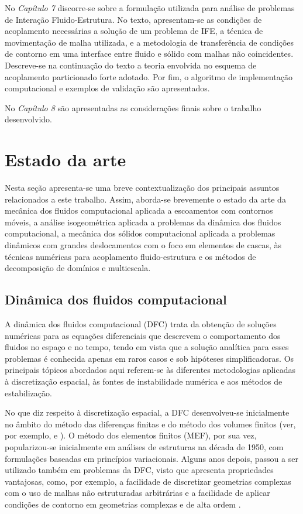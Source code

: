 No \textit{Capítulo 7} discorre-se sobre a formulação utilizada para análise de problemas de Interação Fluido-Estrutura. No texto, apresentam-se as condições de acoplamento necessárias a solução de um problema de IFE, a técnica de movimentação de malha utilizada, e a metodologia de transferência de condições de contorno em uma interface entre fluido e sólido com malhas não coincidentes. Descreve-se na continuação do texto a teoria envolvida no esquema de acoplamento particionado forte adotado. Por fim, o algoritmo de implementação computacional e exemplos de validação são apresentados.

No \textit{Capítulo 8} são apresentadas as considerações finais sobre o trabalho desenvolvido. 

\section[Estado da Arte]{Estado da arte}\label{section:estado_da_arte}

Nesta seção apresenta-se uma breve contextualização dos principais assuntos relacionados a este trabalho. Assim, aborda-se brevemente o estado da arte da mecânica dos fluidos computacional aplicada a escoamentos com contornos móveis, a análise isogeométrica aplicada a problemas da dinâmica dos fluidos computacional, a mecânica dos sólidos computacional aplicada a problemas dinâmicos com grandes deslocamentos com o foco em elementos de cascas, às técnicas numéricas para acoplamento fluido-estrutura e os métodos de decomposição de domínios e multiescala. 

\subsection{Dinâmica dos fluidos computacional}
\label{cfd}

A dinâmica dos fluidos computacional (DFC) trata da obtenção de soluções numéricas para as  equações diferenciais que descrevem o comportamento dos fluidos no espaço e no tempo, tendo em vista que a solução analítica para esses problemas é conhecida apenas em raros casos e sob hipóteses simplificadoras. Os principais tópicos abordados aqui referem-se às diferentes metodologias aplicadas à discretização espacial, às fontes de instabilidade numérica e aos métodos de estabilização.

No que diz respeito à discretização espacial, a DFC desenvolveu-se inicialmente no âmbito do método das diferenças finitas e do método dos volumes finitos (ver, por exemplo,  e ). O método dos elementos finitos (MEF), por sua vez, popularizou-se inicialmente em análises de estruturas na década de 1950, com formulações baseadas em princípios variacionais. Alguns anos depois, passou a ser utilizado também em problemas da DFC, visto que apresenta propriedades vantajosas, como, por exemplo, a facilidade de discretizar geometrias complexas com o uso de malhas não estruturadas arbitrárias e a facilidade de aplicar condições de contorno em geometrias complexas e de alta ordem \cite{ReddyG:2000,ZienkiewiczTN:2005a}.

